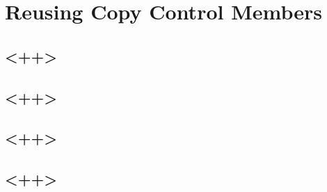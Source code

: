 \chapter{Reusing Copy Control Members}

\section{<++>}

\section{<++>}

\section{<++>}

\section{<++>}

